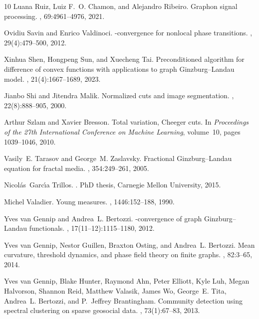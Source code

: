\documentclass[11pt]{amsart}
\numberwithin{equation}{section}
\begin{document}
\begin{thebibliography}{10}
Luana Ruiz, Luiz F.~O. Chamon, and Alejandro Ribeiro.
\newblock Graphon signal processing.
, 69:4961--4976, 2021.

Ovidiu Savin and Enrico Valdinoci.
\newblock {$\Gamma$}-convergence for nonlocal phase transitions.
,
  29(4):479--500, 2012.

Xinhua Shen, Hongpeng Sun, and Xuecheng Tai.
\newblock Preconditioned algorithm for difference of convex functions with
  applications to graph {G}inzburg--{L}andau model.
, 21(4):1667--1689, 2023.

Jianbo Shi and Jitendra Malik.
\newblock Normalized cuts and image segmentation.
,
  22(8):888--905, 2000.

Arthur Szlam and Xavier Bresson.
\newblock Total variation, {C}heeger cuts.
\newblock In {\em Proceedings of the 27th International Conference on Machine
  Learning}, volume~10, pages 1039--1046, 2010.

Vasily~E. Tarasov and George~M. Zaslavsky.
\newblock Fractional {G}inzburg--{L}andau equation for fractal media.
, 354:249--261, 2005.

Nicol{\'a}s~Garc{\'\i}a Trillos.
.
\newblock PhD thesis, Carnegie Mellon University, 2015.

Michel Valadier.
\newblock Young measures.
, 1446:152--188, 1990.

Yves van Gennip and Andrea~L. Bertozzi.
\newblock {$\Gamma$}-convergence of graph {G}inzburg--{L}andau functionals.
, 17(11--12):1115--1180, 2012.

Yves van Gennip, Nestor Guillen, Braxton Osting, and Andrea~L. Bertozzi.
\newblock Mean curvature, threshold dynamics, and phase field theory on finite
  graphs.
, 82:3--65, 2014.

Yves van Gennip, Blake Hunter, Raymond Ahn, Peter Elliott, Kyle Luh, Megan
  Halvorson, Shannon Reid, Matthew Valasik, James Wo, George~E. Tita, Andrea~L.
  Bertozzi, and P.~Jeffrey Brantingham.
\newblock Community detection using spectral clustering on sparse geosocial
  data.
, 73(1):67--83, 2013.


\end{thebibliography}
\end{document}

